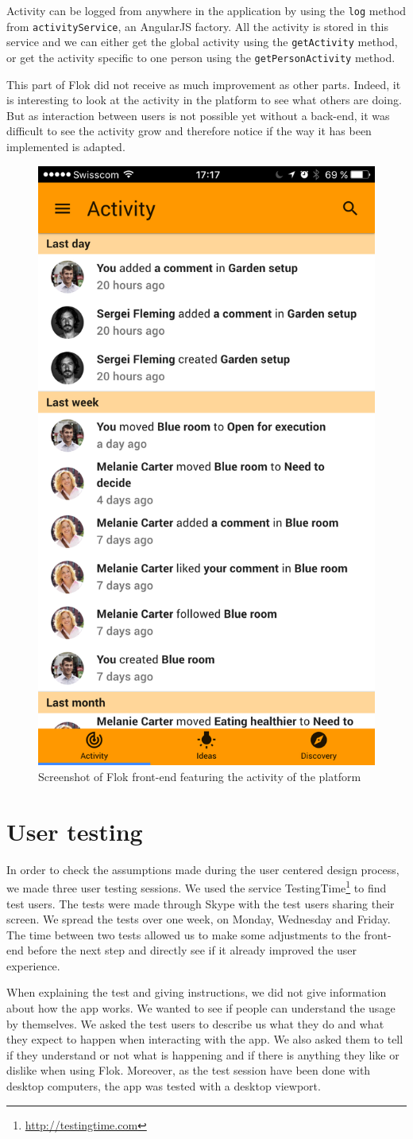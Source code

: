 \documentclass[a4paper,12pt, oneside]{article}
\begin{document}
Activity can be logged from anywhere in the application by using the \texttt{log} method from \texttt{activityService}, an AngularJS factory.
All the activity is stored in this service and we can either get the global activity using the \texttt{getActivity} method, or get the activity specific to one person using the \texttt{getPersonActivity} method.

This part of Flok did not receive as much improvement as other parts.
Indeed, it is interesting to look at the activity in the platform to see what others are doing.
But as interaction between users is not possible yet without a back-end, it was difficult to see the activity grow and therefore notice if the way it has been implemented is adapted.

\begin{figure}[!htb]
    \centering
    \includegraphics[width=.32\textwidth]{images/activity.png}
    \caption{Screenshot of Flok front-end featuring the activity of the platform}
    \label{fig.activity}
\end{figure}

\section{User testing}
In order to check the assumptions made during the user centered design process, we made three user testing sessions.
We used the service TestingTime\footnote{\url{http://testingtime.com}} to find test users.
The tests were made through Skype with the test users sharing their screen.
We spread the tests over one week, on Monday, Wednesday and Friday.
The time between two tests allowed us to make some adjustments to the front-end before the next step and directly see if it already improved the user experience.

When explaining the test and giving instructions, we did not give information about how the app works.
We wanted to see if people can understand the usage by themselves.
We asked the test users to describe us what they do and what they expect to happen when interacting with the app.
We also asked them to tell if they understand or not what is happening and if there is anything they like or dislike when using Flok.
Moreover, as the test session have been done with desktop computers, the app was tested with a desktop viewport.
\end{document}
